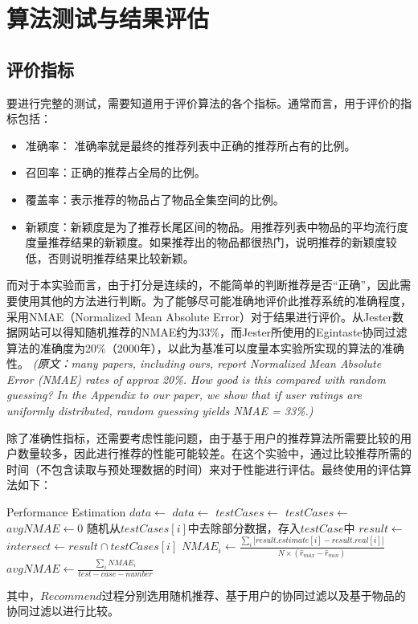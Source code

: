 \documentclass{article}
\begin{document}
\section{算法测试与结果评估}
\label{sec:suan_fa_ce_shi_}

\subsection{评价指标}
\label{sub:ping_gu_fang_fa_}
\par 要进行完整的测试，需要知道用于评价算法的各个指标。通常而言，用于评价的指标包括：
\begin{itemize}
    \item 准确率： 准确率就是最终的推荐列表中正确的推荐所占有的比例。
    \item 召回率：正确的推荐占全局的比例。
    \item 覆盖率：表示推荐的物品占了物品全集空间的比例。
    \item 新颖度：新颖度是为了推荐长尾区间的物品。用推荐列表中物品的平均流行度度量推荐结果的新颖度。如果推荐出的物品都很热门，说明推荐的新颖度较低，否则说明推荐结果比较新颖。
\end{itemize}
\par 而对于本实验而言，由于打分是连续的，不能简单的判断推荐是否``正确''，因此需要使用其他的方法进行判断。为了能够尽可能准确地评价此推荐系统的准确程度，采用NMAE（Normalized Mean Absolute Error）对于结果进行评价。从Jester数据网站可以得知随机推荐的NMAE约为33\%，而Jester所使用的Egintaste协同过滤算法的准确度为20\%（2000年），以此为基准可以度量本实验所实现的算法的准确性。\newline
\textit{(原文：many papers, including ours, report Normalized Mean Absolute Error (NMAE) rates of approx 20\%. How good is this compared with random guessing? In the Appendix to our paper, we show that if user ratings are uniformly distributed, random guessing yields NMAE = 33\%.)}

\par 除了准确性指标，还需要考虑性能问题，由于基于用户的推荐算法所需要比较的用户数量较多，因此进行推荐的性能可能较差。在这个实验中，通过比较推荐所需的时间（不包含读取与预处理数据的时间）来对于性能进行评估。最终使用的评估算法如下：
\begin{simpleAlgorithm}{Performance Estimation}
    \State \(data \leftarrow\) 
    \State \(data \leftarrow\) 
    \State \(testCases \leftarrow\) 
    \State \(testCases \leftarrow\) 
    \State \(avgNMAE \leftarrow 0\)
        \State 随机从\(testCases[i]\)中去除部分数据，存入\(testCase\)中
        \State \(result \leftarrow\) 
        \State \(intersect \leftarrow result\cap testCases[i]\)
        \State \(NMAE_i \leftarrow \frac{\sum_i|result.estimate[i] - result.real[i]|}{N\times (\hat{r}_{max} - \hat{r}_{min})}\)
    \EndFor
    \State \(avgNMAE \leftarrow \frac{\sum_i NMAE_i}{test-case-number}\)
    \EndProcedure
\end{simpleAlgorithm}
\par 其中，\(Recommend\)过程分别选用随机推荐、基于用户的协同过滤以及基于物品的协同过滤以进行比较。
\end{document}
